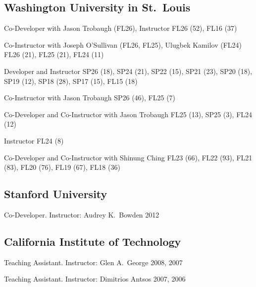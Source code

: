 
\subsection*[Washington University in St. Louis]{Washington University in St.\ Louis} 
         
     {Co-Developer with Jason Trobaugh (FL26), Instructor}
     {FL26 (52), FL16 (37)}

     {Co-Instructor with Joseph O'Sullivan (FL26, FL25), Ulugbek Kamilov (FL24)}
     {FL26 (21), FL25 (21), FL24 (11)}

     {Developer and Instructor}
     {SP26 (18), SP24 (21), SP22 (15), SP21 (23), SP20 (18), SP19 (12), SP18 (28), SP17 (15), FL15 (18)}

     {Co-Instructor with Jason Trobaugh}
     {SP26 (46), FL25 (7)}
         
     {Co-Developer and Co-Instructor with Jason Trobaugh}
     {FL25 (13), SP25 (3), FL24 (12)}

     {Instructor}
     {FL24 (8)}

     {Co-Developer and Co-Instructor with Shinung Ching}
     {FL23 (66), FL22 (93), FL21 (83), FL20 (76), FL19 (67), FL18 (36)}


\subsection*[Stanford]{Stanford University}
  
     {Co-Developer. Instructor: Audrey K.\ Bowden}
     {2012}

\subsection*[Caltech]{California Institute of Technology}
  
     {Teaching Assistant. Instructor: Glen A.\ George}
     {2008, 2007}
     
     {Teaching Assistant. Instructor: Dimitrios Antsos}
     {2007, 2006}